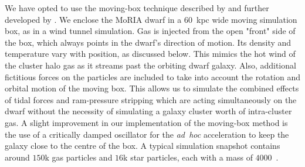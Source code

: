 We have opted to use the moving-box technique described by \citet{Nichols2015} and further developed by \citet{Hausammann2019}.
We enclose the MoRIA dwarf in a $60$~kpc wide moving simulation box, as in a wind tunnel simulation.
Gas is injected from the open "front" side of the box, which always points in the dwarf's direction of motion. Its density and temperature vary with position, as discussed below. This mimics the hot wind of the cluster halo gas as it streams past the orbiting dwarf galaxy.
Also, additional fictitious forces on the particles are included to take into account the rotation and orbital motion of the moving box.
This allows us to simulate the combined effects of tidal forces and ram-pressure stripping \citep[as studied by][]{Mayer2006} which are acting simultaneously on the dwarf without the necessity of simulating a galaxy cluster worth of intra-cluster gas.
A slight improvement in our implementation of the moving-box method is the use of a critically damped oscillator for the \emph{ad~hoc} acceleration to keep the galaxy close to the centre of the box. 
A typical simulation snapshot contains around $150$k gas particles and $16$k star particles, each with a mass of $4000$~\Msun{}.

